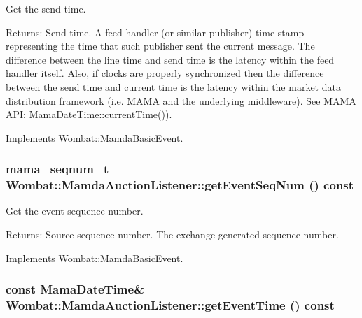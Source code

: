 Get the send time. 

\begin{Desc}
\item[Returns:]Send time. A feed handler (or similar publisher) time stamp representing the time that such publisher sent the current message. The difference between the line time and send time is the latency within the feed handler itself. Also, if clocks are properly synchronized then the difference between the send time and current time is the latency within the market data distribution framework (i.e. MAMA and the underlying middleware). See MAMA API: Mama\-Date\-Time::current\-Time()). \end{Desc}


Implements \hyperlink{classWombat_1_1MamdaBasicEvent_b0602a83bec20cd8b341ec866ff3bffa}{Wombat::Mamda\-Basic\-Event}.\hypertarget{classWombat_1_1MamdaAuctionListener_22c842018863f4240872c7f7eb193b98}{
\subsubsection[getEventSeqNum]{\setlength{\rightskip}{0pt plus 5cm}mama\_\-seqnum\_\-t Wombat::Mamda\-Auction\-Listener::get\-Event\-Seq\-Num () const}}
\label{classWombat_1_1MamdaAuctionListener_22c842018863f4240872c7f7eb193b98}


Get the event sequence number. 

\begin{Desc}
\item[Returns:]Source sequence number. The exchange generated sequence number. \end{Desc}


Implements \hyperlink{classWombat_1_1MamdaBasicEvent_1fd845d48e95b4ee3beafc72d1ac2adf}{Wombat::Mamda\-Basic\-Event}.\hypertarget{classWombat_1_1MamdaAuctionListener_677e3629c44bbf21a134c1fb490658f8}{
\subsubsection[getEventTime]{\setlength{\rightskip}{0pt plus 5cm}const Mama\-Date\-Time\& Wombat::Mamda\-Auction\-Listener::get\-Event\-Time () const}}
\label{classWombat_1_1MamdaAuctionListener_677e3629c44bbf21a134c1fb490658f8}


